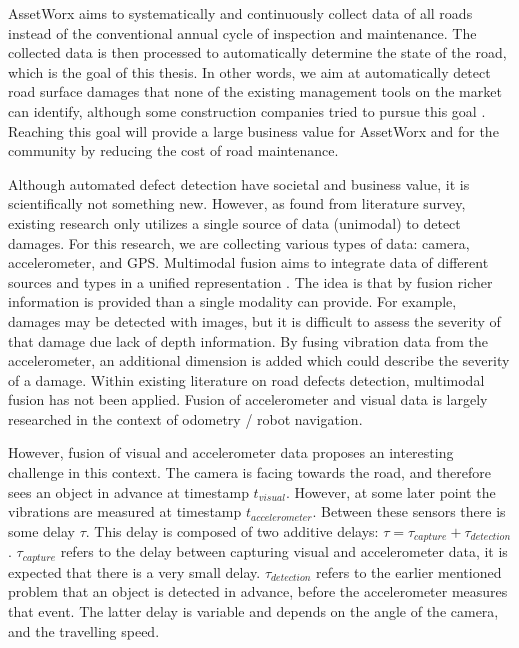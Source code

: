 AssetWorx aims to systematically and continuously collect data of all roads instead of the conventional annual cycle of inspection and maintenance. The collected data is then processed to automatically determine the state of the road, which is the goal of this thesis. In other words, we aim at automatically detect road surface damages that  none of the existing management tools on the market can identify, although some construction companies tried to pursue this goal \cite{BAM2018}. Reaching this goal will provide a large business value for AssetWorx and for the community by reducing the cost of road maintenance.

Although automated defect detection have societal and business value, it is scientifically not something new. However, as found from literature survey, existing research only utilizes a single source of data (unimodal) to detect damages. For this research, we are collecting various types of data: camera, accelerometer, and GPS. Multimodal fusion aims to integrate data of different sources and types in a unified representation \cite{Baltrusaitis2017}. The idea is that by fusion richer information is provided than a single modality can provide. For example, damages may be detected with images, but it is difficult to assess the severity of that damage due lack of depth information. By fusing vibration data from the accelerometer, an additional dimension is added which could describe the severity of a damage. Within existing literature on road defects detection, multimodal fusion has not been applied. Fusion of accelerometer and visual data is largely researched in the context of odometry / robot navigation.

However, fusion of visual and accelerometer data proposes an interesting challenge in this context. The camera is facing towards the road, and therefore sees an object in advance at timestamp $t_{visual}$. However, at some later point the vibrations are measured at timestamp $t_{accelerometer}$. Between these sensors there is some delay $\tau$. This delay is composed of two additive delays: $\tau = \tau_{capture} + \tau_{detection}$. $\tau_{capture}$ refers to the delay between capturing visual and accelerometer data, it is expected that there is a very small delay. $\tau_{detection}$ refers to the earlier mentioned problem that an object is detected in advance, before the accelerometer measures that event. The latter delay is variable and depends on the angle of the camera, and the travelling speed.

